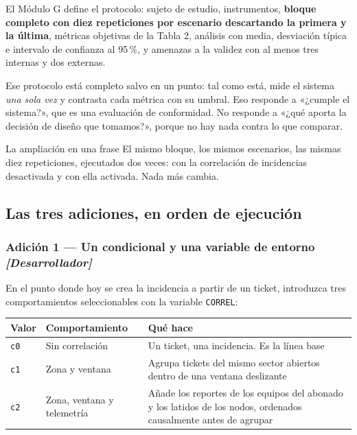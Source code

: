 \documentclass[11pt,a4paper]{article}
\begin{document}
El Módulo G define el protocolo: sujeto de estudio, instrumentos, \textbf{bloque completo con diez repeticiones por escenario descartando la primera y la última}, métricas objetivas de la Tabla 2, análisis con media, desviación típica e intervalo de confianza al 95\,\%, y amenazas a la validez con al menos tres internas y dos externas.

Ese protocolo está completo salvo en un punto: tal como está, mide el sistema \emph{una sola vez} y contrasta cada métrica con su umbral. Eso responde a «¿cumple el sistema?», que es una evaluación de conformidad. No responde a «¿qué aporta la decisión de diseño que tomamos?», porque no hay nada contra lo que comparar.

\begin{uteqbox}{La ampliación en una frase}
	El mismo bloque, los mismos escenarios, las mismas diez repeticiones, ejecutados dos veces: con la correlación de incidencias desactivada y con ella activada. Nada más cambia.
\end{uteqbox}

\subsection{Las tres adiciones, en orden de ejecución}

\subsubsection{Adición 1 --- Un condicional y una variable de entorno \emph{[Desarrollador]}}

En el punto donde hoy se crea la incidencia a partir de un ticket, introduzca tres comportamientos seleccionables con la variable \texttt{CORREL}:

\begin{center}
	\small
	\begin{tabular}{@{}p{1.4cm}p{4.0cm}p{9.6cm}@{}}
		\toprule
		\textbf{Valor} & \textbf{Comportamiento} & \textbf{Qué hace} \\
		\midrule
		\texttt{c0} & Sin correlación & Un ticket, una incidencia. Es la línea base \\
		\addlinespace
		\texttt{c1} & Zona y ventana & Agrupa tickets del mismo sector abiertos dentro de una ventana deslizante \\
		\addlinespace
		\texttt{c2} & Zona, ventana y telemetría & Añade los reportes de los equipos del abonado y los latidos de los nodos, ordenados causalmente antes de agrupar \\
		\bottomrule
	\end{tabular}
\end{center}
\end{document}
